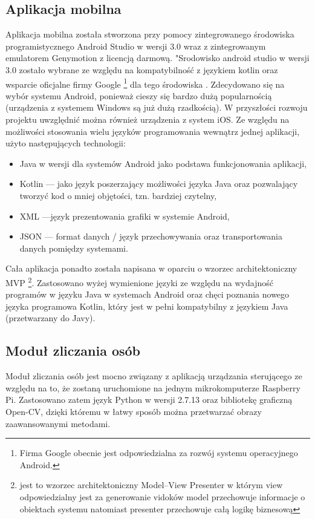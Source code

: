 \subsection{Aplikacja mobilna}
Aplikacja mobilna została stworzona przy pomocy zintegrowanego środowiska programistycznego Android Studio w wersji 3.0 wraz z zintegrowanym emulatorem Genymotion z licencją darmową. "Srodowisko android studio w wersji 3.0 zostało wybrane ze względu na kompatybilność z językiem kotlin oraz wsparcie oficjalne firmy Google
 \footnote{Firma Google obecnie jest odpowiedzialna za rozwój systemu operacyjnego Android.}
 dla tego środowiska . Zdecydowano się na wybór systemu Android, ponieważ cieszy się bardzo dużą popularnością (urządzenia z systemem Windows są już dużą rzadkością). W przyszłości rozwoju projektu uwzględnić można również urządzenia z system iOS. Ze względu na możliwości stosowania wielu języków programowania wewnątrz jednej aplikacji, użyto następujących technologii:
\begin{itemize}
	\item Java w wersji dla systemów Android jako podstawa funkcjonowania aplikacji,
	\item Kotlin --- jako język poszerzający możliwości języka Java oraz pozwalający tworzyć kod o mniej objętości, tzn. bardziej czytelny,
	\item XML ---język prezentowania grafiki w systemie Android,
	\item JSON --- format danych / język przechowywania oraz transportowania danych pomiędzy systemami.
\end{itemize}
Cała aplikacja ponadto została napisana w oparciu o wzorzec architektoniczny MVP \footnote{ jest to wzorzec architektoniczny Model--View Presenter w którym view odpowiedzialny jest za generowanie vidoków model przechowuje informacje o obiektach systemu natomiast presenter przechowuje całą logikę biznesową}. Zastosowano wyżej wymienione języki ze względu na wydajność programów w języku Java w systemach Android oraz chęci poznania nowego języka programowa Kotlin, który jest w pełni kompatybilny z językiem Java (przetwarzany do Javy).  

\subsection{Moduł zliczania osób}
Moduł zliczania osób jest mocno związany z aplikacją urządzania sterującego ze względu na to, że zostaną uruchomione na jednym mikrokomputerze Raspberry Pi. Zastosowano zatem język Python w wersji 2.7.13 oraz bibliotekę graficzną Open-CV\cite{OCV}, dzięki któremu w łatwy sposób można przetwarzać obrazy zaawansowanymi metodami. 

